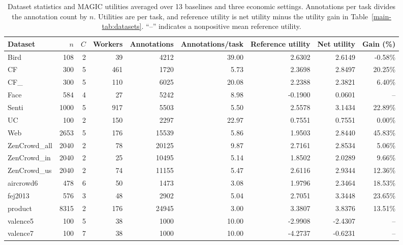 \documentclass[journal]{IEEEtran}
\newcommand{\smalltable}{\footnotesize\setlength{\tabcolsep}{3.5pt}}
\begin{document}
\begin{table}[t]
\caption{Dataset statistics and MAGIC utilities averaged over 13 baselines and three economic settings. Annotations per task divides the annotation count by $n$. Utilities are per task, and reference utility is net utility minus the utility gain in Table~\ref{main-tab:datasets}. ``--'' indicates a nonpositive mean reference utility.}
\label{tab:datastats}\centering\smalltable
\begin{tabular}{lrrrrrrrr}
\toprule
Dataset & $n$ & $C$ & Workers & Annotations & Annotations/task & Reference utility & Net utility & Gain (\%) \\
\midrule
Bird & 108 & 2 & 39 & 4212 & 39.00 & 2.6302 & 2.6149 & -0.58\% \\
CF & 300 & 5 & 461 & 1720 & 5.73 & 2.3698 & 2.8497 & 20.25\% \\
CF\_ & 300 & 5 & 110 & 6025 & 20.08 & 2.2388 & 2.3821 & 6.40\% \\
Face & 584 & 4 & 27 & 5242 & 8.98 & -0.1900 & 0.0601 & -- \\
Senti & 1000 & 5 & 917 & 5503 & 5.50 & 2.5578 & 3.1434 & 22.89\% \\
UC & 100 & 2 & 150 & 2297 & 22.97 & 0.7551 & 0.7551 & 0.00\% \\
Web & 2653 & 5 & 176 & 15539 & 5.86 & 1.9503 & 2.8440 & 45.83\% \\
ZenCrowd\_all & 2040 & 2 & 78 & 20125 & 9.87 & 2.7161 & 2.8534 & 5.06\% \\
ZenCrowd\_in & 2040 & 2 & 25 & 10495 & 5.14 & 1.8502 & 2.0289 & 9.66\% \\
ZenCrowd\_us & 2040 & 2 & 74 & 11155 & 5.47 & 2.6116 & 2.9344 & 12.36\% \\
aircrowd6 & 478 & 6 & 50 & 1473 & 3.08 & 1.9796 & 2.3464 & 18.53\% \\
fej2013 & 576 & 3 & 48 & 2902 & 5.04 & 2.7051 & 3.3448 & 23.65\% \\
product & 8315 & 2 & 176 & 24945 & 3.00 & 3.3807 & 3.8376 & 13.51\% \\
valence5 & 100 & 5 & 38 & 1000 & 10.00 & -2.9908 & -2.4307 & -- \\
valence7 & 100 & 7 & 38 & 1000 & 10.00 & -4.2737 & -0.6231 & -- \\
\bottomrule
\end{tabular}
\end{table}
\end{document}
